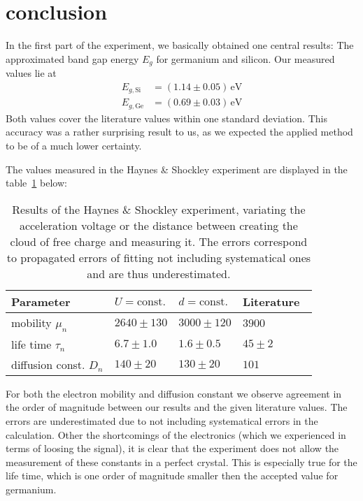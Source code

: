 \section{conclusion}
In the first part of the experiment, we basically obtained one 
central results: The approximated band gap energy $E_g$ for germanium 
and silicon. Our measured values lie at 
\begin{align}
    E_{g, \mathrm{Si}} &= (1.14 \pm 0.05) \,\mathrm{eV} \\
    E_{g, \mathrm{Ge}} &= (0.69 \pm 0.03) \,\mathrm{eV}
\end{align}
Both values cover the literature values within one standard deviation.
This accuracy was a rather surprising result to us, as we expected the 
applied method to be of a much lower certainty. 

The values measured in the Haynes \& Shockley experiment 
are displayed in the table~\ref{tab:conc_h_s} below:
\renewcommand{\arraystretch}{1.5}
\begin{table}[H]
    \centering
    \caption{
        Results of the Haynes \& Shockley experiment, variating the 
        acceleration voltage or the distance between creating the 
        cloud of free charge and measuring it. The errors correspond 
        to propagated errors of fitting not including systematical ones 
        and are thus underestimated. 
        }
	\begin{tabular}{|p{4cm}|p{3cm}|p{3cm}|p{3cm}|}
		\hline
		\rowcolor{tabcolor}
		Parameter           & $U = \text{const.}$   & $d = \text{const.}$   & Literature~\cite{staatsexamen} \\ 
        \hline
        mobility $\mu_n$    & $2640 \pm 130$        & $3000 \pm 120$        & $3900$     \\
        life time $\tau_n$  & $6.7 \pm 1.0$         & $1.6 \pm 0.5$         & $45 \pm 2$ \\
        diffusion const. $D_n$ & $140 \pm 20$      & $130 \pm 20$          & $101$     \\
		\hline
	\end{tabular}
    \label{tab:conc_h_s}
\end{table}
For both the electron mobility and diffusion constant we observe agreement in the 
order of magnitude between our results and the given literature values. The 
errors are underestimated due to not including systematical errors in the calculation. 
Other the shortcomings of the electronics (which we experienced in terms 
of loosing the signal), it is clear that the experiment does not allow the 
measurement of these constants in a perfect crystal. This is especially 
true for the life time, which is one order of magnitude smaller then the 
accepted value for germanium. 

